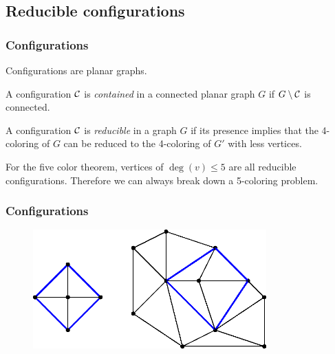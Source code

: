 \subsection{Reducible configurations}

\begin{frame}
    \frametitle{Configurations}

    Configurations are planar graphs.

    \begin{definition}
        A configuration $\mathcal{C}$ is \textit{contained} in a connected planar graph $G$ if $G\setminus \mathcal{C}$ is connected.
    \end{definition}

    \begin{definition}
        A configuration $\mathcal{C}$ is \emph{reducible} in a graph $G$ if its presence implies that the 4-coloring of $G$ can be reduced to the 4-coloring of $G'$ with less vertices.
    \end{definition}

    For the five color theorem, vertices of $\deg(v) \leq 5$ are all reducible configurations. Therefore we can always break down a 5-coloring problem.
\end{frame}

\begin{frame}
    \frametitle{Configurations}
    \begin{figure}
        \includegraphics[width=0.8\textwidth]{images/contain1_good.eps}
    \end{figure}
\end{frame}

